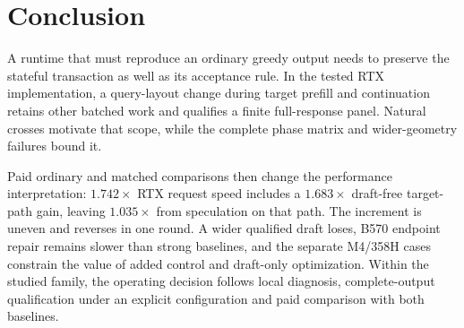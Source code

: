 \section{Conclusion}
A runtime that must reproduce an ordinary greedy output needs to preserve the stateful transaction as well as its acceptance rule. In the tested RTX implementation, a query-layout change during target prefill and continuation retains other batched work and qualifies a finite full-response panel. Natural crosses motivate that scope, while the complete phase matrix and wider-geometry failures bound it.

Paid ordinary and matched comparisons then change the performance interpretation: $1.742\times$ RTX request speed includes a $1.683\times$ draft-free target-path gain, leaving $1.035\times$ from speculation on that path. The increment is uneven and reverses in one round. A wider qualified draft loses, B570 endpoint repair remains slower than strong baselines, and the separate M4/358H cases constrain the value of added control and draft-only optimization. Within the studied family, the operating decision follows local diagnosis, complete-output qualification under an explicit configuration and paid comparison with both baselines.
